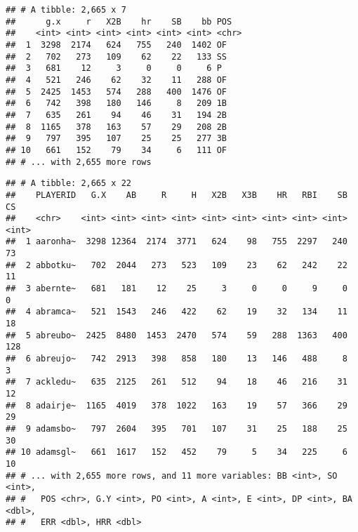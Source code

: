 \documentclass[]{book}
\newenvironment{Shaded}{\begin{snugshade}}{\end{snugshade}}
\newcommand{\KeywordTok}[1]{\textcolor[rgb]{0.13,0.29,0.53}{\textbf{#1}}}
\newcommand{\DataTypeTok}[1]{\textcolor[rgb]{0.13,0.29,0.53}{#1}}
\newcommand{\StringTok}[1]{\textcolor[rgb]{0.31,0.60,0.02}{#1}}
\newcommand{\CommentTok}[1]{\textcolor[rgb]{0.56,0.35,0.01}{\textit{#1}}}
\newcommand{\OperatorTok}[1]{\textcolor[rgb]{0.81,0.36,0.00}{\textbf{#1}}}
\newcommand{\NormalTok}[1]{#1}
\begin{document}
\begin{verbatim}
## # A tibble: 2,665 x 7
##      g.x     r   X2B    hr    SB    bb POS  
##    <int> <int> <int> <int> <int> <int> <chr>
##  1  3298  2174   624   755   240  1402 OF   
##  2   702   273   109    62    22   133 SS   
##  3   681    12     3     0     0     6 P    
##  4   521   246    62    32    11   288 OF   
##  5  2425  1453   574   288   400  1476 OF   
##  6   742   398   180   146     8   209 1B   
##  7   635   261    94    46    31   194 2B   
##  8  1165   378   163    57    29   208 2B   
##  9   797   395   107    25    25   277 3B   
## 10   661   152    79    34     6   111 OF   
## # ... with 2,655 more rows
\end{verbatim}

\begin{Shaded}
\end{Shaded}

\begin{verbatim}
## # A tibble: 2,665 x 22
##    PLAYERID   G.X    AB     R     H   X2B   X3B    HR   RBI    SB    CS
##    <chr>    <int> <int> <int> <int> <int> <int> <int> <int> <int> <int>
##  1 aaronha~  3298 12364  2174  3771   624    98   755  2297   240    73
##  2 abbotku~   702  2044   273   523   109    23    62   242    22    11
##  3 abernte~   681   181    12    25     3     0     0     9     0     0
##  4 abramca~   521  1543   246   422    62    19    32   134    11    18
##  5 abreubo~  2425  8480  1453  2470   574    59   288  1363   400   128
##  6 abreujo~   742  2913   398   858   180    13   146   488     8     3
##  7 ackledu~   635  2125   261   512    94    18    46   216    31    12
##  8 adairje~  1165  4019   378  1022   163    19    57   366    29    29
##  9 adamsbo~   797  2604   395   701   107    31    25   188    25    30
## 10 adamsgl~   661  1617   152   452    79     5    34   225     6    10
## # ... with 2,655 more rows, and 11 more variables: BB <int>, SO <int>,
## #   POS <chr>, G.Y <int>, PO <int>, A <int>, E <int>, DP <int>, BA <dbl>,
## #   ERR <dbl>, HRR <dbl>
\end{verbatim}

\begin{Shaded}
\end{Shaded}
\end{document}
